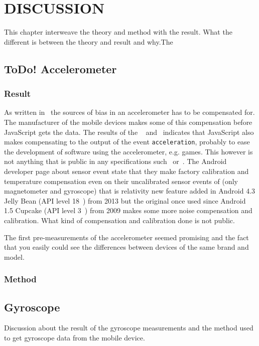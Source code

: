 \chapter{DISCUSSION}\label{cha:discussion}
This chapter interweave the theory and method with the result. What the different is between the theory and result and why.The

\section{\textbf{ToDo! }Accelerometer}
\subsection{Result}
As written in~\cite{acc:kionixerr} the sources of bias in an accelerometer has to be compensated for. The manufacturer of the mobile devices makes some of this compensation before JavaScript gets the data. The results of the ~ and~ indicates that JavaScript also makes compensating to the output of the event \texttt{acceleration}, probably to ease the development of software using the accelerometer, e.g. games. This however is not anything that is public in any specifications such~\cite{sensor:W3Cspec} or~\cite{sensor:accIncludingGravity}. The Android developer page about sensor event \cite{android:sensorEvent} state that they make factory calibration and temperature compensation even on their uncalibrated sensor events of (only magnetometer and gyroscope) that is relativity new feature added in Android 4.3 Jelly Bean (API level 18~\cite{android:API18}) from 2013 but the original once used since Android 1.5 Cupcake (API level 3~\cite{android:API3}) from 2009 makes some more noise compensation and calibration. What kind of compensation and calibration done is not public. 

The first pre-measurements of the accelerometer seemed promising and the fact that you easily could see the differences between devices of the same brand and model. 
\subsection{Method}

\section{Gyroscope}
Discussion about the result of the gyroscope measurements and the method used to get gyroscope data from the mobile device.
